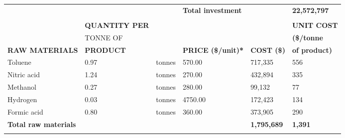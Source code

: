 \begin{table}[H]
\begin{tabular}{llllll}
                                        &                       &                                       & \multicolumn{2}{l}{\textbf{Total investment}}          & \textbf{22,572,797}  \\
                                        &                       &                                       &                           &                            &                      \\
                                        & \textbf{QUANTITY PER} &                                       &                           &                            & \textbf{UNIT COST}   \\
                                        & TONNE OF              &                                       &                           &                            & \textbf{(\$/tonne}   \\
\textbf{RAW MATERIALS}                  & \textbf{PRODUCT}      & \textbf{}                             & \textbf{PRICE (\$/unit)*} & \textbf{COST (\$)}         & \textbf{of product)} \\ \hline
Toluene                                 & 0.97                  & tonnes                                & 570.00                    & 717,335                    & 556                  \\
Nitric acid                             & 1.24                  & tonnes                                & 270.00                    & 432,894                    & 335                  \\
Methanol                                & 0.27                  & tonnes                                & 280.00                    & 99,132                     & 77                   \\
Hydrogen                                & 0.03                  & tonnes                                & 4750.00                   & 172,423                    & 134                  \\
Formic acid                             & 0.80                  & tonnes                                & 360.00                    & 373,905                    & 290                  \\ \cline{5-6} 
\textbf{Total raw materials}            & \textbf{}             & \textbf{}                             & \textbf{}                 & \textbf{1,795,689}         & \textbf{1,391}       \\
                                        &                       &                                       &                           & \textbf{}                  &                      \\

\end{tabular}
\end{table}

